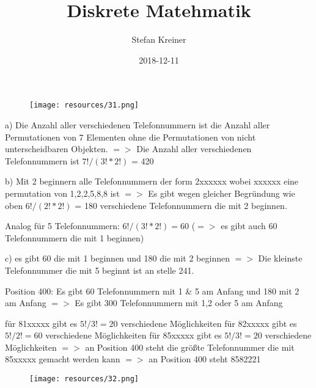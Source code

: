 \documentclass[12pt]{article}   %
\title{Diskrete Matehmatik}
\author{Stefan Kreiner}
\date{2018-12-11}
\begin{document}
\maketitle

\begin{figure}[ht]
\centerline{\hspace{-1cm}
    \texttt{[image: resources/31.png]}} 
\end{figure}

a) Die Anzahl aller verschiedenen Telefonnummern ist die Anzahl aller Permutationen von 7 Elementen ohne die Permutationen von nicht unterscheidbaren Objekten.
$=>$ Die Anzahl aller verschiedenen Telefonnummern ist $7!/(3!*2!)$ = 420


b) Mit 2 beginnern alle Telefonnummern der form 2xxxxxx wobei xxxxxx eine permutation von 1,2,2,5,8,8 ist
$=>$ Es gibt wegen gleicher Begründung wie oben $6!/(2!*2!)$ = 180 verschiedene Telefonnummern die mit 2 beginnen.

Analog für 5 Telefonnummern: $6!/(3!*2!) = 60$
($=>$ es gibt auch 60 Telefonnummern die mit 1 beginnen)


c) es gibt 60 die mit 1 beginnen und 180 die mit 2 beginnen
$=>$ Die kleinste Telefonnummer die mit 5 beginnt ist an stelle 241.

Position 400:
Es gibt 60 Telefonnummern mit 1 \& 5 am Anfang und 180 mit 2 am Anfang 
$=>$ Es gibt 300 Telefonnummern mit 1,2 oder 5 am Anfang

für 81xxxxx gibt es $5!/3! = 20$ verschiedene Möglichkeiten
für 82xxxxx gibt es $5!/2! = 60$ verschiedene Möglichkeiten
für 85xxxxx gibt es $5!/3! = 20$ verschiedene Möglichkeiten
$=>$ an Position 400 steht die größte Telefonnummer die mit 85xxxxx gemacht werden kann
$=>$ an Position 400 steht 8582221


\begin{figure}[ht]
\centerline{\hspace{-1cm}
    \texttt{[image: resources/32.png]}} 
\label{fig:fun}
\end{figure}
\end{document}
